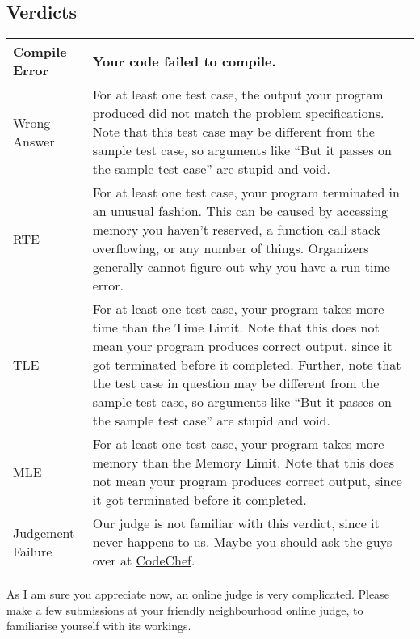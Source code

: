     \subsection{Verdicts}
        \begin{center}
            \begin{tabular}{| l | p{25em} |}
                \hline
                Compile Error & Your code failed to compile. \\
                \hline
                Wrong Answer & For at least one test case, the output your program produced did not match the problem specifications. Note that this test case may be different from the sample test case, so arguments like ``But it passes on the sample test case'' are stupid and void. \\
                \hline
                RTE & For at least one test case, your program terminated in an unusual fashion. This can be caused by accessing memory you haven't reserved, a function call stack overflowing, or any number of things. Organizers generally cannot figure out why you have a run-time error. \\
                \hline
                TLE & For at least one test case, your program takes more time than the Time Limit. Note that this does not mean your program produces correct output, since it got terminated before it completed. Further, note that the test case in question may be different from the sample test case, so arguments like ``But it passes on the sample test case'' are stupid and void. \\
                \hline
                MLE & For at least one test case, your program takes more memory than the Memory Limit. Note that this does not mean your program produces correct output, since it got terminated before it completed. \\
                \hline
                Judgement Failure & Our judge is not familiar with this verdict, since it never happens to us. Maybe you should ask the guys over at \textcolor{blue}{\href{https://www.codechef.com}{CodeChef}}. \\
                \hline
            \end{tabular}
        \end{center}
    As I am sure you appreciate now, an online judge is very complicated. Please make a few submissions at your friendly neighbourhood online judge, to familiarise yourself with its workings.
